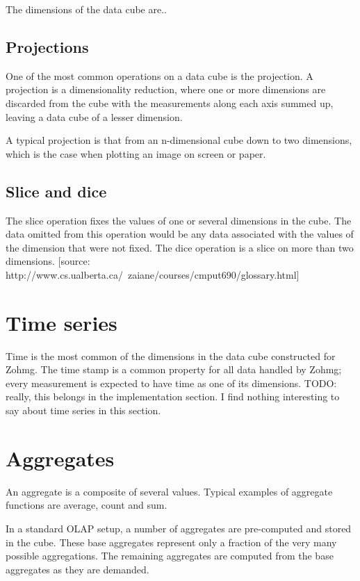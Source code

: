 \documentclass[a4paper,10pt]{book}
\begin{document}
The dimensions of the data cube are.. 

\subsection{Projections}

One of the most common operations on a data cube is the projection. A projection is a dimensionality reduction, where one or more dimensions are discarded from the cube with the measurements along each axis summed up, leaving a data cube of a lesser dimension.

A typical projection is that from an n-dimensional cube down to two dimensions, which is the case when plotting an image on screen or paper.


\subsection{Slice and dice}

The slice operation fixes the values of one or several dimensions in the cube. The data omitted from this operation would be any data associated with the values of the dimension that were not fixed. The dice operation is a slice on more than two dimensions. [source: http://www.cs.ualberta.ca/~zaiane/courses/cmput690/glossary.html]

\section{Time series}

Time is the most common of the dimensions in the data cube constructed for Zohmg. The time stamp is a common property for all data handled by Zohmg; every measurement is expected to have time as one of its dimensions. TODO: really, this belongs in the implementation section. I find nothing interesting to say about time series in this section.

\section{Aggregates}

An aggregate is a composite of several values. Typical examples of aggregate functions are average, count and sum.

In a standard OLAP setup, a number of aggregates are pre-computed and stored in the cube. These base aggregates represent only a fraction of the very many possible aggregations. The remaining aggregates are computed from the base aggregates as they are demanded.
\end{document}
